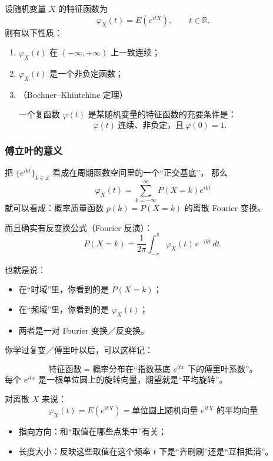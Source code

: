 \begin{lemma}[特征函数的性质]
设随机变量 $X$ 的特征函数为 
\[
\varphi_X(t)=E\!\left(e^{itX}\right),\qquad t\in\mathbb R.
\]
则有以下性质：

\begin{enumerate}
  \item $\varphi_X(t)$ 在 $(-\infty,+\infty)$ 上一致连续；

  \item $\varphi_X(t)$ 是一个非负定函数；

  \item （Bochner–Khintchine 定理）
  
  一个复函数 $\varphi(t)$ 是某随机变量的特征函数的充要条件是：
  \[
  \varphi(t)\ \text{连续、非负定，且}\ \varphi(0)=1 .
  \]
\end{enumerate}
\end{lemma}
\subsubsection{傅立叶的意义}

把 $\{e^{ikt}\}_{k\in\mathbb Z}$ 看成在周期函数空间里的一个“正交基底”，
那么
\[
\varphi_X(t)=\sum_{k=-\infty}^{\infty} P(X=k)e^{ikt}
\]
就可以看成：概率质量函数 $p(k)=P(X=k)$ 的离散 Fourier 变换。

而且确实有反变换公式（Fourier 反演）：
\[
P(X=k)=\frac{1}{2\pi}\int_{-\pi}^{\pi} \varphi_X(t)\,e^{-ikt}\,dt.
\]

也就是说：
\begin{itemize}
  \item 在“时域”里，你看到的是 $P(X=k)$；
  \item 在“频域”里，你看到的是 $\varphi_X(t)$；
  \item 两者是一对 Fourier 变换／反变换。
\end{itemize}

你学过复变／傅里叶以后，可以这样记：

\[
\text{特征函数} = \text{概率分布在“指数基底 } e^{itx} \text{ 下的傅里叶系数”。}
\]
每个 $e^{itx}$ 是一根单位圆上的旋转向量，期望就是“平均旋转”。

\bigskip


对离散 $X$ 来说：
\[
\boxed{\ \varphi_X(t)=E(e^{itX})
      =\text{单位圆上随机向量 } e^{itX} \text{ 的平均向量}\ }
\]

\begin{itemize}
  \item 指向方向：和“取值在哪些点集中”有关；
  \item 长度大小：反映这些取值在这个频率 $t$ 下是“齐刷刷”还是“互相抵消”。
\end{itemize}

